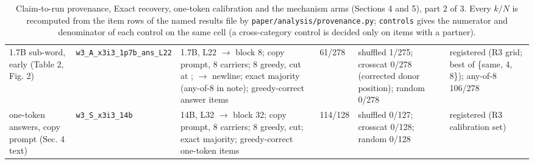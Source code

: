 \begin{table}[t]
\begin{tabular}{@{}p{2.5cm}p{2.3cm}p{4.5cm}p{1.3cm}p{3.0cm}p{2.9cm}@{}}
1.7B sub-word, early (Table 2, Fig. 2) & \texttt{w3\_\allowbreak{{}}A\_\allowbreak{{}}x3i3\_\allowbreak{{}}1p7b\_\allowbreak{{}}ans\_\allowbreak{{}}L22} & 1.7B, L22 $\to$ block 8; copy prompt, 8 carriers; 8 greedy, cut at ; $\to$ newline; exact majority (any-of-8 in note); greedy-correct answer items & 61/278 & shuffled 1/275; crosscat 0/278 (corrected donor position); random 0/278 & registered (R3 grid; best of \{same, 4, 8\}); any-of-8 106/278 \\
one-token answers, copy prompt (Sec. 4 text) & \texttt{w3\_\allowbreak{{}}S\_\allowbreak{{}}x3i3\_\allowbreak{{}}14b} & 14B, L32 $\to$ block 32; copy prompt, 8 carriers; 8 greedy, cut; exact majority; greedy-correct one-token items & 114/128 & shuffled 0/127; crosscat 0/128; random 0/128 & registered (R3 calibration set) \\
\bottomrule
\end{tabular}
\caption{Claim-to-run provenance, Exact recovery, one-token calibration and the mechanism arms (Sections 4 and 5), part 2 of 3. Every $k/N$ is recomputed from the item rows of the named results file by \texttt{paper/analysis/provenance.py}; \texttt{controls} gives the numerator and denominator of each control on the same cell (a cross-category control is decided only on items with a partner).}
\end{table}

